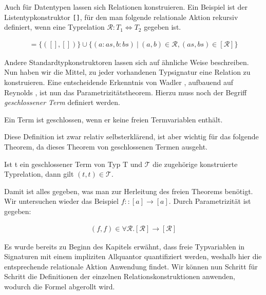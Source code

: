 Auch für Datentypen lassen sich Relationen konstruieren. Ein Beispiel ist der Listentypkonstruktor \texttt{[]}, für den man folgende
relationale Aktion rekursiv definiert, wenn eine Typ\-re\-lati\-on $\mathcal{R} : T_1 \Leftrightarrow T_2$ gegeben ist.

\begin{align*}
[\mathcal{R}] = \{ ([], []) \} \cup \{ (a : as, b : bs) ~|~ (a, b) \in \mathcal{R}, (as, bs) \in [\mathcal{R}] \}
\end{align*}

Andere Standardtypkonstruktoren lassen sich auf ähnliche Weise beschreiben. Nun haben wir die Mittel, zu jeder vorhandenen
Typsignatur eine Relation zu konstruieren. Eine entscheidende Erkenntnis von Wadler \cite{wadler}, aufbauend auf
Reynolds \cite{reynolds}, ist nun das Parametrizitätstheorem. Hierzu muss noch der Begriff \textit{geschlossener Term} definiert werden.

\begin{mydef}
Ein Term ist geschlossen, wenn er keine freien Termvariablen enthält.
\end{mydef}

Diese Definition ist zwar relativ selbsterklärend, ist aber wichtig für das folgende Theorem, da dieses Theorem von geschlossenen
Termen ausgeht.

\begin{mytheorem}[Parametrizität]
Ist t ein geschlossener Term von Typ T und $\mathcal{T}$ die zugehörige konstruierte Typrelation, dann gilt $(t, t) \in \mathcal{T}$.
\end{mytheorem}

Damit ist alles gegeben, was man zur Herleitung des freien Theorems benötigt. Wir untersuchen wieder das Beispiel
$f :: [a] \rightarrow [a]$. Durch Parametrizität ist gegeben:

\begin{align*}
(f, f) \in \forall \mathcal{R} . [\mathcal{R}] \rightarrow [\mathcal{R}]
\end{align*}

Es wurde bereits zu Beginn des Kapitels erwähnt, dass freie Typvariablen in Signaturen mit einem impliziten Allquantor
quantifiziert werden, weshalb hier die entsprechende relationale Aktion Anwendung findet.
Wir können nun Schritt für Schritt die Definitionen der einzelnen Relationskonstruktionen anwenden, wodurch die Formel
abgerollt wird.

